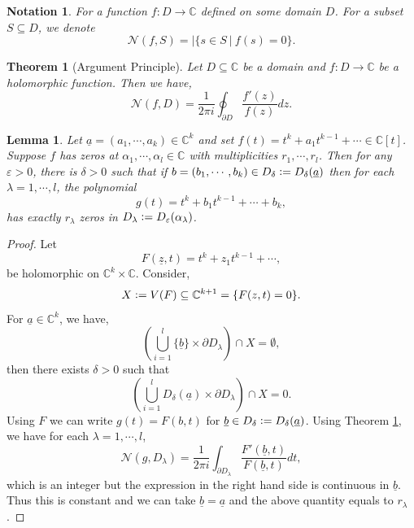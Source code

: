 \documentclass{article}
\newtheorem{theorem}{Theorem} [section]
\newtheorem{lemma}{Lemma}[section]
\newtheorem{notation}{Notation}[section]
\newcommand{\defeq}{\vcentcolon=}
\newcommand{\C}[0]{\mathbb{C}}
\newcommand{\sep}[0]{\:|\:}
\newcommand{\bd}[0]{\partial}
\begin{document}
\begin{notation}
  For a function $f:D\to\C$ defined on some domain $D$. For a subset $S\subseteq D$, we denote
  \begin{equation*}
    \mathcal{N}(f,S) =\vert\{s\in S\sep f(s)=0\}.
  \end{equation*}
\end{notation}

\begin{theorem}[Argument Principle]
  Let $D\subseteq\C$ be a domain and $f:D\to\C$ be a holomorphic function. Then we have,
  \begin{equation*}
    \mathcal{N}(f,D) = {\frac 1 {2\pi i}}\oint_{\bd D}{\frac {f'(z)} {f(z)}}dz.
  \end{equation*}
  \label{theorem_argument_principle}
\end{theorem}

\begin{lemma}
  \label{lemma_zeros_exhaustion}
  Let $\underline{a}=(a_1,\cdots,a_k)\in \C^k$ and set $f(t) = t^k+a_1t^{k-1}+\cdots\in\C[t]$. Suppose $f$ has zeros at $\alpha_1,\cdots,\alpha_l\in\C$ with multiplicities $r_1,\cdots,r_l$. Then for any $\varepsilon>0$, there is $\delta>0$ such that 
  if $b = (b_1,\cdots,b_k)\in D_\delta\defeq D_\delta(\underline{a})$ then for each $\lambda=1,\cdots,l$, the polynomial
  \begin{equation*}
    g(t) = t^k+b_1t^{k-1}+\cdots+b_k,
  \end{equation*}
  has exactly $r_\lambda$ zeros in $D_\lambda\defeq D_\varepsilon(\alpha_\lambda)$.
\end{lemma}

\begin{proof}
  Let 
  \begin{equation*}
    F(\underline{z},t) = t^k+z_1t^{k-1}+\cdots,
  \end{equation*}
  be holomorphic on $\C^k\times \C$. Consider,
  \begin{equation*}
  X \defeq V(F) \subseteq \C^{k+1} = \{F(z,t)=0\}.
  \end{equation*}
  For $\underline{a}\in \C^k$, we have,
  \begin{equation*}
    \left(\bigcup_{i=1}^l \{\underline{b}\}\times \partial D_\lambda\right)\cap X = \emptyset,
  \end{equation*}
  then there exists $\delta>0$ such that
  \begin{equation*}
    \left(\bigcup_{i=1}^l D_\delta(\underline{a})\times\partial D_\lambda\right)\cap X = 0.
  \end{equation*}
  Using $F$ we can write $g(t) = F(b,t)$ for $\underline{b}\in D_\delta\defeq D_\delta(\underline{a})$. Using Theorem \ref{theorem_argument_principle}, we have for each $\lambda=1,\cdots,l$,
  \begin{equation*}
   \mathcal{N}(g,D_\lambda) ={\frac {1} {2\pi i}}\int_{\partial D_\lambda}{\frac {F'(\underline{b},t)} {F(\underline{b},t)}}dt,
  \end{equation*}
  which is an integer but the expression in the right hand side is continuous in $\underline{b}$. Thus this is constant and we can take $\underline{b} = \underline{a}$ and the above quantity equals to $r_\lambda$.
\end{proof}
\end{document}
